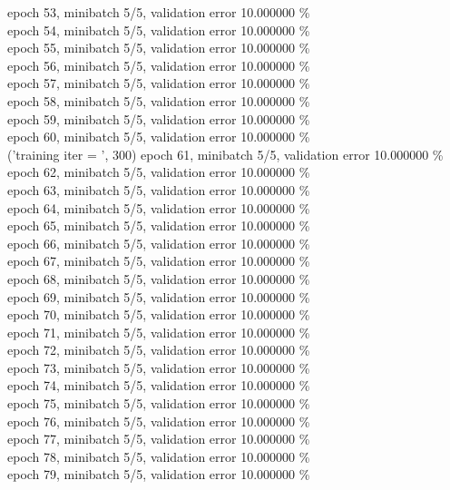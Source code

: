 \documentclass[a4paper]{article}
\begin{document}
epoch 53, minibatch 5/5, validation error 10.000000 \% \\
epoch 54, minibatch 5/5, validation error 10.000000 \% \\
epoch 55, minibatch 5/5, validation error 10.000000 \% \\
epoch 56, minibatch 5/5, validation error 10.000000 \% \\
epoch 57, minibatch 5/5, validation error 10.000000 \% \\
epoch 58, minibatch 5/5, validation error 10.000000 \% \\
epoch 59, minibatch 5/5, validation error 10.000000 \% \\
epoch 60, minibatch 5/5, validation error 10.000000 \% \\
('training \@ iter = ', 300)
epoch 61, minibatch 5/5, validation error 10.000000 \% \\
epoch 62, minibatch 5/5, validation error 10.000000 \% \\
epoch 63, minibatch 5/5, validation error 10.000000 \% \\
epoch 64, minibatch 5/5, validation error 10.000000 \% \\
epoch 65, minibatch 5/5, validation error 10.000000 \% \\
epoch 66, minibatch 5/5, validation error 10.000000 \% \\
epoch 67, minibatch 5/5, validation error 10.000000 \% \\
epoch 68, minibatch 5/5, validation error 10.000000 \% \\
epoch 69, minibatch 5/5, validation error 10.000000 \% \\
epoch 70, minibatch 5/5, validation error 10.000000 \% \\
epoch 71, minibatch 5/5, validation error 10.000000 \% \\
epoch 72, minibatch 5/5, validation error 10.000000 \% \\
epoch 73, minibatch 5/5, validation error 10.000000 \% \\
epoch 74, minibatch 5/5, validation error 10.000000 \% \\
epoch 75, minibatch 5/5, validation error 10.000000 \% \\
epoch 76, minibatch 5/5, validation error 10.000000 \% \\
epoch 77, minibatch 5/5, validation error 10.000000 \% \\
epoch 78, minibatch 5/5, validation error 10.000000 \% \\
epoch 79, minibatch 5/5, validation error 10.000000 \% \\
\end{document}
